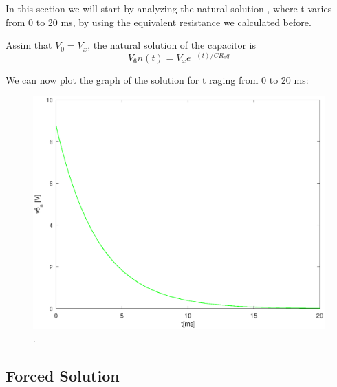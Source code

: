 In this section we will start by analyzing the natural solution , where t varies from 0 to 20 ms, by using the equivalent resistance we calculated before.

Assim that $V_0 = V_x$, the natural solution of the capacitor is  
\begin{equation}
	V_6n(t) = V_xe^{-(t)/CR_eq}
\end{equation}

We can now plot the graph of the solution for t raging from 0 to 20 ms:

\begin{figure}[h] \centering
\includegraphics[width=0.6\linewidth]{natural.eps}
\caption{.}
\label{fig:rc1}
\end{figure}
	
\subsection{Forced Solution}

